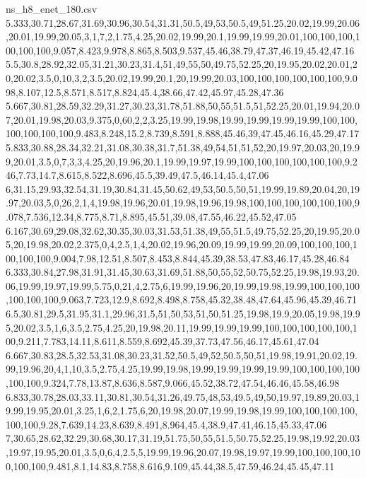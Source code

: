 \begin{filecontents*}[overwrite]{ns_h8_enet_180.csv}
5.333,30.71,28.67,31.69,30.96,30.54,31.31,50.5,49,53,50.5,49,51.25,20.02,19.99,20.06,20.01,19.99,20.05,3,1,7,2,1.75,4.25,20.02,19.99,20.1,19.99,19.99,20.01,100,100,100,100,100,100,9.057,8.423,9.978,8.865,8.503,9.537,45.46,38.79,47.37,46.19,45.42,47.16
5.5,30.8,28.92,32.05,31.21,30.23,31.4,51,49,55,50,49.75,52.25,20,19.95,20.02,20.01,20,20.02,3.5,0,10,3,2,3.5,20.02,19.99,20.1,20,19.99,20.03,100,100,100,100,100,100,9.098,8.107,12.5,8.571,8.517,8.824,45.4,38.66,47.42,45.97,45.28,47.36
5.667,30.81,28.59,32.29,31.27,30.23,31.78,51.88,50,55,51.5,51,52.25,20.01,19.94,20.07,20.01,19.98,20.03,9.375,0,60,2,2,3.25,19.99,19.98,19.99,19.99,19.99,19.99,100,100,100,100,100,100,9.483,8.248,15.2,8.739,8.591,8.888,45.46,39,47.45,46.16,45.29,47.17
5.833,30.88,28.34,32.21,31.08,30.38,31.7,51.38,49,54,51,51,52,20,19.97,20.03,20,19.99,20.01,3.5,0,7,3,3,4.25,20,19.96,20.1,19.99,19.97,19.99,100,100,100,100,100,100,9.246,7.73,14.7,8.615,8.522,8.696,45.5,39.49,47.5,46.14,45.4,47.06
6,31.15,29.93,32.54,31.19,30.84,31.45,50.62,49,53,50.5,50,51,19.99,19.89,20.04,20,19.97,20.03,5,0,26,2,1,4,19.98,19.96,20.01,19.98,19.96,19.98,100,100,100,100,100,100,9.078,7.536,12.34,8.775,8.71,8.895,45.51,39.08,47.55,46.22,45.52,47.05
6.167,30.69,29.08,32.62,30.35,30.03,31.53,51.38,49,55,51.5,49.75,52.25,20,19.95,20.05,20,19.98,20.02,2.375,0,4,2.5,1,4,20.02,19.96,20.09,19.99,19.99,20.09,100,100,100,100,100,100,9.004,7.98,12.51,8.507,8.453,8.844,45.39,38.53,47.83,46.17,45.28,46.84
6.333,30.84,27.98,31.91,31.45,30.63,31.69,51.88,50,55,52,50.75,52.25,19.98,19.93,20.06,19.99,19.97,19.99,5.75,0,21,4,2.75,6,19.99,19.96,20,19.99,19.98,19.99,100,100,100,100,100,100,9.063,7.723,12.9,8.692,8.498,8.758,45.32,38.48,47.64,45.96,45.39,46.71
6.5,30.81,29.5,31.95,31.1,29.96,31.5,51,50,53,51,50,51.25,19.98,19.9,20.05,19.98,19.95,20.02,3.5,1,6,3.5,2.75,4.25,20,19.98,20.11,19.99,19.99,19.99,100,100,100,100,100,100,9.211,7.783,14.11,8.611,8.559,8.692,45.39,37.73,47.56,46.17,45.61,47.04
6.667,30.83,28.5,32.53,31.08,30.23,31.52,50.5,49,52,50.5,50,51,19.98,19.91,20.02,19.99,19.96,20,4,1,10,3.5,2.75,4.25,19.99,19.98,19.99,19.99,19.99,19.99,100,100,100,100,100,100,9.324,7.78,13.87,8.636,8.587,9.066,45.52,38.72,47.54,46.46,45.58,46.98
6.833,30.78,28.03,33.11,30.81,30.54,31.26,49.75,48,53,49.5,49,50,19.97,19.89,20.03,19.99,19.95,20.01,3.25,1,6,2,1.75,6,20,19.98,20.07,19.99,19.98,19.99,100,100,100,100,100,100,9.28,7.639,14.23,8.639,8.491,8.964,45.4,38.9,47.41,46.15,45.33,47.06
7,30.65,28.62,32.29,30.68,30.17,31.19,51.75,50,55,51.5,50.75,52.25,19.98,19.92,20.03,19.97,19.95,20.01,3.5,0,6,4,2.5,5,19.99,19.96,20.07,19.98,19.97,19.99,100,100,100,100,100,100,9.481,8.1,14.83,8.758,8.616,9.109,45.44,38.5,47.59,46.24,45.45,47.11

\end{filecontents*}

